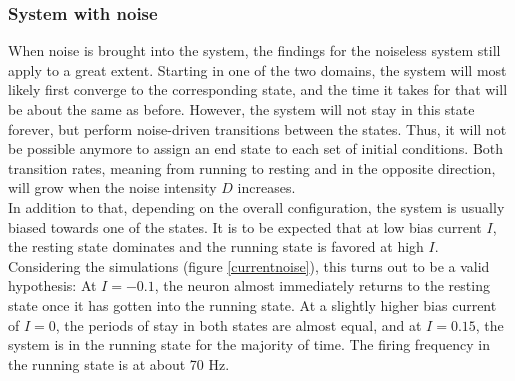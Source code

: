 \documentclass[12pt,a4paper]{article}
\begin{document}
\subsubsection{System with noise}
When noise is brought into the system, the findings for the noiseless system still apply to a great extent. Starting in one of the two domains, the system will most likely first converge to the corresponding state, and the time it takes for that will be about the same as before. However, the system will not stay in this state forever, but perform noise-driven transitions between the states. Thus, it will not be possible anymore to assign an end state to each set of initial conditions. Both transition rates, meaning from running to resting and in the opposite direction, will grow when the noise intensity $D$ increases. \\
In addition to that, depending on the overall configuration, the system is usually biased towards one of the states. It is to be expected that at low bias current $I$, the resting state dominates and the running state is favored at high $I$. Considering the simulations (figure \ref{currentnoise}), this turns out to be a valid hypothesis: At $I=-0.1$, the neuron almost immediately returns to the resting state once it has gotten into the running state. At a slightly higher bias current of $I=0$, the periods of stay in both states are almost equal, and at $I=0.15$, the system is in the running state for the majority of time. The firing frequency in the running state is at about 70 Hz.
\end{document}
